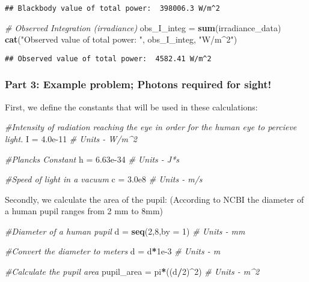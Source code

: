 \documentclass[]{article}
\newenvironment{Shaded}{\begin{snugshade}}{\end{snugshade}}
\newcommand{\KeywordTok}[1]{\textcolor[rgb]{0.13,0.29,0.53}{\textbf{#1}}}
\newcommand{\DataTypeTok}[1]{\textcolor[rgb]{0.13,0.29,0.53}{#1}}
\newcommand{\DecValTok}[1]{\textcolor[rgb]{0.00,0.00,0.81}{#1}}
\newcommand{\FloatTok}[1]{\textcolor[rgb]{0.00,0.00,0.81}{#1}}
\newcommand{\StringTok}[1]{\textcolor[rgb]{0.31,0.60,0.02}{#1}}
\newcommand{\CommentTok}[1]{\textcolor[rgb]{0.56,0.35,0.01}{\textit{#1}}}
\newcommand{\OperatorTok}[1]{\textcolor[rgb]{0.81,0.36,0.00}{\textbf{#1}}}
\newcommand{\NormalTok}[1]{#1}
\begin{document}
\begin{verbatim}
## Blackbody value of total power:  398006.3 W/m^2
\end{verbatim}

\begin{Shaded}
\begin{Highlighting}[]
\CommentTok{# Observed Integration (irradiance)}
\NormalTok{obs_I_integ =}\StringTok{ }\KeywordTok{sum}\NormalTok{(irradiance_data)}
\KeywordTok{cat}\NormalTok{(}\StringTok{"Observed value of total power: "}\NormalTok{, obs_I_integ, }\StringTok{"W/m^2"}\NormalTok{)}
\end{Highlighting}
\end{Shaded}

\begin{verbatim}
## Observed value of total power:  4582.41 W/m^2
\end{verbatim}

\subsubsection{Part 3: Example problem; Photons required for
sight!}\label{part-3-example-problem-photons-required-for-sight}

First, we define the constants that will be used in these calculations:

\begin{Shaded}
\begin{Highlighting}[]
\CommentTok{#Intensity of radiation reaching the eye in order for the human eye to percieve light.}
\NormalTok{I =}\StringTok{ }\FloatTok{4.0e-11} \CommentTok{# Units - W/m^2}

\CommentTok{#Plancks Constant }
\NormalTok{h =}\StringTok{ }\FloatTok{6.63e-34} \CommentTok{# Units - J*s}

\CommentTok{#Speed of light in a vacuum}
\NormalTok{c =}\StringTok{ }\FloatTok{3.0e8} \CommentTok{# Units - m/s}
\end{Highlighting}
\end{Shaded}

Secondly, we calculate the area of the pupil: (According to NCBI the
diameter of a human pupil ranges from 2 mm to 8mm)

\begin{Shaded}
\begin{Highlighting}[]
\CommentTok{#Diameter of a human pupil}
\NormalTok{d =}\StringTok{ }\KeywordTok{seq}\NormalTok{(}\DecValTok{2}\NormalTok{,}\DecValTok{8}\NormalTok{,}\DataTypeTok{by =} \DecValTok{1}\NormalTok{) }\CommentTok{# Units - mm}

\CommentTok{#Convert the diameter to meters}
\NormalTok{d =}\StringTok{ }\NormalTok{d}\OperatorTok{*}\FloatTok{1e-3} \CommentTok{# Units - m }

\CommentTok{#Calculate the pupil area}
\NormalTok{pupil_area =}\StringTok{ }\NormalTok{pi}\OperatorTok{*}\NormalTok{((d}\OperatorTok{/}\DecValTok{2}\NormalTok{)}\OperatorTok{^}\DecValTok{2}\NormalTok{) }\CommentTok{# Units - m^2}
\end{Highlighting}
\end{Shaded}
\end{document}
